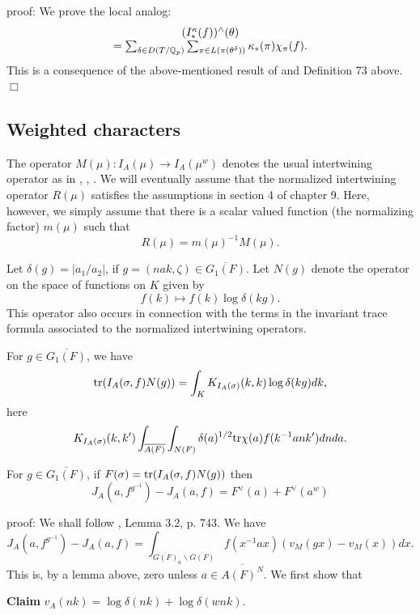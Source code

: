 proof: We prove the local analog:
\[
\begin{array}{c}
(I_{*}^\kappa (f ))^\wedge(\theta) \\
=\sum_{\delta\in D(T/{\Bbb Q}_p)}
\sum_{\pi\in L({\pi }({\theta }^\delta))}
\kappa _{*}(\pi)\chi _{\pi }(f).
\end{array}
\]
This is a consequence of the above-mentioned result of
\cite{LL} and Definition 73 above. $\Box$

\subsection{Weighted characters }

The operator
$M(\mu):I_A(\mu)\rightarrow I_A(\mu^w)$ denotes the usual
intertwining operator as in \cite{Ar}, \cite{Mo1}, \cite{Mo2}.
We will eventually
assume that the normalized intertwining operator
$R(\mu)$ satisfies the assumptions in section 4 of chapter 9.
Here, however, we simply assume that there is a scalar valued
function (the normalizing factor) $m(\mu)$ such that
\[
R(\mu)=m(\mu)^{-1}M(\mu).
\]


Let $\delta(g)=|a_1/a_2|$, if $g=(nak,\zeta)\in \overline{G_1(F)}$. Let
$N(g)$ denote the operator on the space of functions on $K$ given by
\[
f(k)\longmapsto f(k)\log\delta(kg).
\]
This operator also occurs in connection with the terms in the
invariant trace formula associated to the normalized intertwining
operators.

\begin{lemma}
For $g\in \overline{G_1(F)}$, we have
\[
{\rm tr}(I_A(\sigma,f)N(g))
=\int_K K_{I_A(\sigma)}(k,k)\log\delta(kg)dk,
\]
here
\[
K_{I_A(\sigma)}(k,k')
\int_{\overline{A(F)}}\int_{N(F)}
\delta(a)^{1/2}{\rm tr}\chi(a)f(k^{-1}ank')dnda.
\]
\end{lemma}

\begin{lemma}
For $g\in \overline{G_1(F)}$, if
$F(\sigma)={\rm tr}(I_A(\sigma,f)N(g))$ then
\[
J_A(a,f^{g^{-1}})-J_A(a,f)
=F^\vee(a)+F^\vee(a^w)
\]
\end{lemma}
proof: We shall follow \cite{LL}, Lemma 3.2, p. 743.
We have
\[
J_A(a,f^{g^{-1}})-J_A(a,f)
=\int_{\overline{G(F)}_a\backslash \overline{G(F)}}
f(x^{-1}ax)(v_M(gx)-v_M(x))dx.
\]
This is, by a lemma above, zero unless
$a\in\overline{A(F)^N}$. We first show that

{\bf Claim} $v_A(nk)=\log\delta(nk)+\log\delta(wnk)$.

